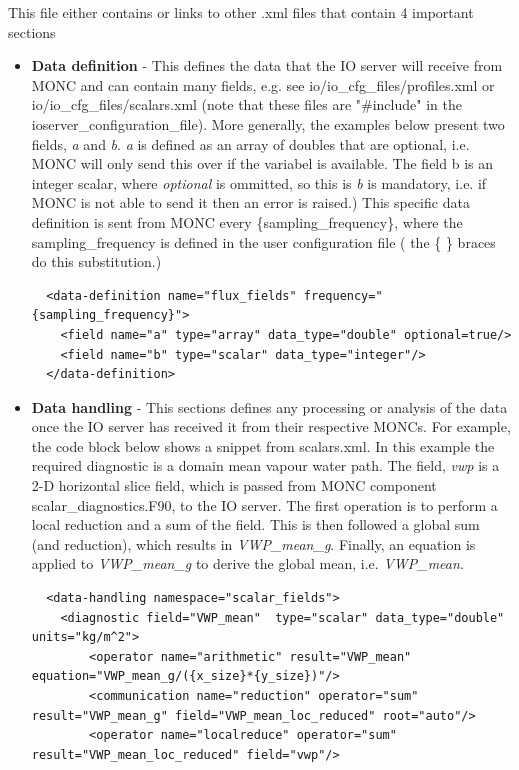 \documentclass[a4paper,11pt]{article}
\begin{document}
This file either contains or links to other .xml files that contain 4 important
sections
\begin{itemize}
  \item {{\bf{Data definition}} - This defines the data that the IO server will
  receive from MONC and can contain many fields, e.g. see
  io/io\_cfg\_files/profiles.xml or io/io\_cfg\_files/scalars.xml
  (note that these files are "\#include" in the ioserver\_configuration\_file).
  More generally, the examples below present two fields, \emph{a} and \emph{b}.
  \emph{a} is defined as an array of doubles that are optional, i.e. MONC will
  only send this over if the variabel is available. The field b is an integer
  scalar, where \emph{optional} is ommitted, so this is \emph{b} is mandatory,
  i.e. if MONC is not able to send it then an error is raised.) This specific
  data definition is sent from MONC every \{sampling\_frequency\}, where the
  sampling\_frequency is defined in the user configuration file ( the \{ \}
  braces do this substitution.)
  \begin{lstlisting}
  <data-definition name="flux_fields" frequency="{sampling_frequency}">
  	<field name="a" type="array" data_type="double" optional=true/>
  	<field name="b" type="scalar" data_type="integer"/>
  </data-definition>
  \end{lstlisting}
  }
  \item{{\bf{Data handling}} - This sections defines any processing or analysis
  of the data once the IO server has received it from their
  respective MONCs. For example, the code block below shows a snippet from
  scalars.xml. In this example the required diagnostic is a domain
  mean vapour water path. The field, \emph{vwp} is a 2-D horizontal slice field,
  which is passed from MONC component scalar\_diagnostics.F90, to the IO
  server. The first operation is to perform a local reduction and a sum of the
  field. This is then followed a global sum (and reduction), which results in
  \emph{VWP\_mean\_g}. Finally, an equation is applied to \emph{VWP\_mean\_g}
  to derive the global mean, i.e.
  \emph{VWP\_mean}.
  \begin{lstlisting}
  <data-handling namespace="scalar_fields">
    <diagnostic field="VWP_mean"  type="scalar" data_type="double" units="kg/m^2">
	    <operator name="arithmetic" result="VWP_mean" equation="VWP_mean_g/({x_size}*{y_size})"/>
	    <communication name="reduction" operator="sum" result="VWP_mean_g" field="VWP_mean_loc_reduced" root="auto"/>
	    <operator name="localreduce" operator="sum" result="VWP_mean_loc_reduced" field="vwp"/>

\end{lstlisting}}
\end{itemize}
\end{document}
